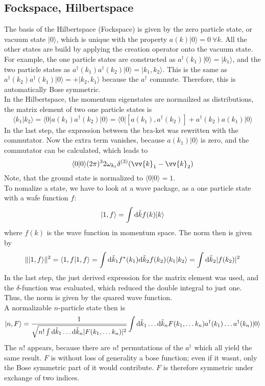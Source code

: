 \documentclass{include/thesisclass}
\newcommand{\rk}{\rangle}
\newcommand{\lk}{\langle}
\newcommand{\dd}{{\rm d}}
\begin{document}
\subsection{Fockspace, Hilbertspace}
The basis of the Hilbertspace (Fockspace) is given by the zero particle state, or vacuum state $|0\rk$, which is unique with the property $a(k)|0\rk = 0~\forall k$. All the other states are build by applying the creation operator onto the vacuum state.\\
For example, the one particle states are constructed as $a^\dagger(k_1)|0\rk = |k_1 \rk$, and the two particle states as $a^\dagger(k_1)a^\dagger(k_2)|0\rk = |k_1, k_2\rk$. This is the same as $a^\dagger(k_2)a^\dagger(k_1)|0\rk = + |k_2,k_1\rk$ because the $a^\dagger$ commute. Therefore, this is automatically Bose symmetric.\\
In the Hilbertspace, the momentum eigenstates are normailzed as distributions, the matrix element of two one particle states is
\[ \lk k_1 | k_2 \rk = \lk 0 | a(k_1)a^\dagger(k_2) | 0 \rk = \lk 0 | [ a(k_1), a^\dagger(k_2)] + a^\dagger(k_2) a(k_1)|0\rk\]
In the last step, the expression between the bra-ket was rewritten with the commutator. Now the extra term vanishes, because $a(k_1)|0\rk$ is zero, and the commutator can be calculated, which leads to
\[ \lk 0 | 0 \rk  (2\pi)^3 2 \omega_{k_1} \delta^{(3)}(\vv{k}_1 - \vv{k}_2)\]
Note, that the ground state is normalized to $\lk 0 | 0 \rk = 1$.\\
To nomalize a state, we have to look at a wave package, as a one particle state with a wafe function $f$:
\[ | 1 , f\rk = \int \dd \tilde{k} f(k) |k\rk\]
where $f(k)$ is the wave function in momentum space. The norm then is given by
\[ \| | 1, f\rk \|^2 = \lk 1, f| 1, f\rk = \int \dd\tilde{k}_1 f^*(k_1) \dd \tilde{k}_2 f(k_2) \lk k_1 |k_2\rk = \int \dd \tilde{k}_2 | f(k_2) |^2\]
In the last step, the just derived expression for the matrix element was used, and the $\delta$-function was evaluated, which reduced the double integral to just one. Thus, the norm is given by the quared wave function.\\
A normalizable $n$-particle state then is
\[ |n, F\rk = \frac{1}{\sqrt{ n! \int \dd \tilde{k}_1 \ldots \dd\tilde{k}_n | F(k_1, \ldots k_n) |^2}} \int \dd \tilde{k}_1 \ldots \dd \tilde{k}_n F(k_1, \ldots k_n) a^\dagger(k_1) \ldots a^\dagger(k_n) |0\rk\]
The $n!$ appears, because there are $n!$ permutations of the $a^\dagger$ which all yield the same result. $F$ is without loss of generality a bose function; even if it wasnt, only the Bose symmetric part of it would contribute. $F$ is therefore symmetric under exchange of two indices.\\
\end{document}
